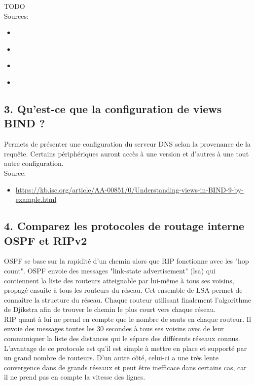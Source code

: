 \documentclass{article}
\begin{document}
TODO\\

Sources:
\begin{itemize}
\item \url{}
\item \url{}
\item \url{}
\item \url{}
\end{itemize}

\subsection*{3. Qu’est-ce que la configuration de views BIND ?}
Permets de présenter une configuration du serveur DNS selon la provenance de la requête. Certains périphériques auront accès à une version et d'autres à une tout autre configuration.\\

Source:
\begin{itemize}
\item \url{https://kb.isc.org/article/AA-00851/0/Understanding-views-in-BIND-9-by-example.html}
\end{itemize}

\subsection*{4. Comparez les protocoles de routage interne OSPF et RIPv2}
OSPF se base sur la rapidité d'un chemin alors que RIP fonctionne avec les "hop count". OSPF envoie des messages "link-state advertisement" (lsa) qui contiennent la liste des routeurs atteignable par lui-même à tous ses voisins, propagé ensuite à tous les routeurs du réseau. Cet ensemble de LSA permet de connaître la structure du réseau. Chaque routeur utilisant finalement l'algorithme de Djikstra afin de trouver le chemin le plus court vers chaque réseau.\\

RIP quant à lui ne prend en compte que le nombre de sauts en chaque routeur. Il envoie des messages toutes les 30 secondes à tous ses voisins avec de leur communiquer la liste des distances qui le sépare des différents réseaux connus. L'avantage de ce protocole est qu'il est simple à mettre en place et supporté par un grand nombre de routeurs. D'un autre côté, celui-ci a une très lente convergence dans de grands réseaux et peut être inefficace dans certains cas, car il ne prend pas en compte la vitesse des lignes.\\
\end{document}
